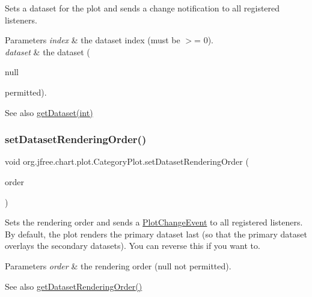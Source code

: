 Sets a dataset for the plot and sends a change notification to all registered listeners.


\begin{DoxyParams}{Parameters}
{\em index} & the dataset index (must be $>$= 0). \\
\hline
{\em dataset} & the dataset (
\begin{DoxyCode}
null 
\end{DoxyCode}
 permitted).\\
\hline
\end{DoxyParams}
\begin{DoxySeeAlso}{See also}
\mbox{\hyperlink{classorg_1_1jfree_1_1chart_1_1plot_1_1_category_plot_a2171d553581f0e3bcf252bad4464cb96}{get\+Dataset(int)}} 
\end{DoxySeeAlso}
\mbox{\label{classorg_1_1jfree_1_1chart_1_1plot_1_1_category_plot_a9aad5e87ec9423894584f64dd7badf5c}} 
\subsubsection{\texorpdfstring{set\+Dataset\+Rendering\+Order()}{setDatasetRenderingOrder()}}
{\footnotesize\ttfamily void org.\+jfree.\+chart.\+plot.\+Category\+Plot.\+set\+Dataset\+Rendering\+Order (\begin{DoxyParamCaption}\item[{\mbox{\hyperlink{classorg_1_1jfree_1_1chart_1_1plot_1_1_dataset_rendering_order}{Dataset\+Rendering\+Order}}}]{order }\end{DoxyParamCaption})}

Sets the rendering order and sends a \mbox{\hyperlink{}{Plot\+Change\+Event}} to all registered listeners. By default, the plot renders the primary dataset last (so that the primary dataset overlays the secondary datasets). You can reverse this if you want to.


\begin{DoxyParams}{Parameters}
{\em order} & the rendering order ({\ttfamily null} not permitted).\\
\hline
\end{DoxyParams}
\begin{DoxySeeAlso}{See also}
\mbox{\hyperlink{classorg_1_1jfree_1_1chart_1_1plot_1_1_category_plot_a697871f5768fb78444390dcfaa9444bd}{get\+Dataset\+Rendering\+Order()}} 
\end{DoxySeeAlso}
\mbox{\label{classorg_1_1jfree_1_1chart_1_1plot_1_1_category_plot_a844d33e1fd8dcbb9399dddb7cdd95630}} 
